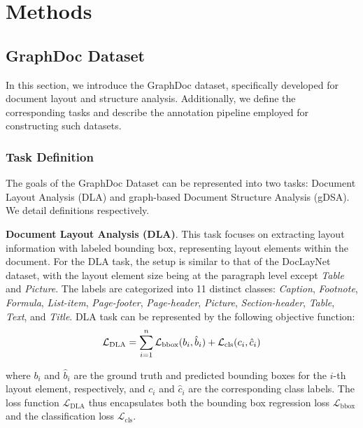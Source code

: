 \section{Methods}
\label{sec:method}

\subsection{GraphDoc Dataset}
In this section, we introduce the GraphDoc dataset, specifically developed for document layout and structure analysis. Additionally, we define the corresponding tasks and describe the annotation pipeline employed for constructing such datasets.

\subsubsection{Task Definition}
The goals of the GraphDoc Dataset can be represented into two tasks: Document Layout Analysis (DLA) and graph-based Document Structure Analysis (gDSA). We detail definitions respectively.

\textbf{Document Layout Analysis (DLA)}. This task focuses on extracting layout information with labeled bounding box, representing layout elements within the document. For the DLA task, the setup is similar to that of the DocLayNet~\citep{doclaynet2022} dataset, with the layout element size being at the paragraph level except \textit{Table} and \textit{Picture}. The labels are categorized into 11 distinct classes: \textit{Caption}, \textit{Footnote}, \textit{Formula}, \textit{List-item}, \textit{Page-footer}, \textit{Page-header}, \textit{Picture}, \textit{Section-header}, \textit{Table}, \textit{Text}, and \textit{Title}. DLA task can be represented by the following objective function:
\vspace{ -5px}
\begin{equation}
    \mathcal{L}_{\text{DLA}} = \sum_{i=1}^{n} \mathcal{L}_{\text{bbox}}(b_i, \hat{b}_i) + \mathcal{L}_{\text{cls}}(c_i, \hat{c}_i)
\vspace{ -10px}
\end{equation}

where $ b_i $ and $ \hat{b}_i $ are the ground truth and predicted bounding boxes for the $i$-th layout element, respectively, and $ c_i $ and $ \hat{c}_i $ are the corresponding class labels. The loss function $\mathcal{L}_{\text{DLA}}$ thus encapsulates both the bounding box regression loss $\mathcal{L}_{\text{bbox}}$ and the classification loss $\mathcal{L}_{\text{cls}}$.

